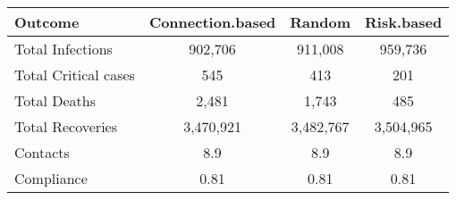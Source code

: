 \begin{table}[ht]
\centering
\begin{tabular}{lccc}
  \hline
Outcome & Connection.based & Random & Risk.based \\ 
  \hline
Total Infections &   902,706 & 911,008 & 959,736 \\ 
  Total Critical cases &       545 & 413 & 201 \\ 
  Total Deaths &     2,481 & 1,743 & 485 \\ 
  Total Recoveries & 3,470,921 & 3,482,767 & 3,504,965 \\ 
  Contacts &       8.9 & 8.9 & 8.9 \\ 
  Compliance &      0.81 & 0.81 & 0.81 \\ 
   \hline
\end{tabular}
\end{table}
